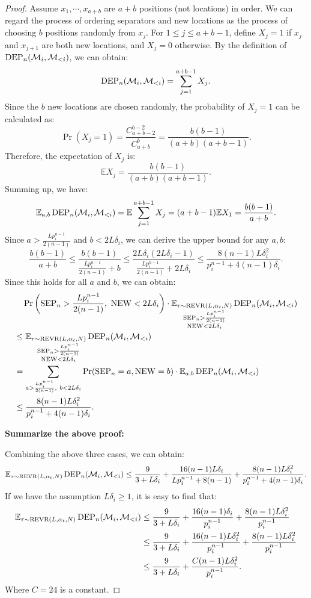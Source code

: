 \begin{proof}
Assume $x_1,\cdots,x_{a+b}$ are $a+b$ positions (not locations) in order. We can regard the process of ordering separators and new locations as the process of choosing $b$ positions randomly from $x_j$. For $1\leq j\leq a+b-1$, define $X_j=1$ if $x_j$ and $x_{j+1}$ are both new locations, and $X_j=0$ otherwise. By the definition of $\operatorname{DEP}_n({\mathcal{M}}_i, {\mathcal{M}}_{<i})$, we can obtain:
$$\operatorname{DEP}_n({\mathcal{M}}_i, {\mathcal{M}}_{<i})=\sum_{j=1}^{a+b-1}X_j.$$
Since the $b$ new locations are chosen randomly, the probability of $X_j=1$ can be calculated as:
$$\Pr(X_j=1)=\frac{C_{a+b-2}^{b-2}}{C_{a+b}^{b}}=\frac{b(b-1)}{(a+b)(a+b-1)}.$$
Therefore, the expectation of $X_j$ is:
$$\mathbb{E}X_j=\frac{b(b-1)}{(a+b)(a+b-1)}.$$
Summing up, we have:
$$\mathbb{E}_{a,b}\operatorname{DEP}_n({\mathcal{M}}_i, {\mathcal{M}}_{<i})=\mathbb{E}\sum_{j=1}^{a+b-1}X_j=(a+b-1)\mathbb{E}X_1=\frac{b(b-1)}{a+b}.$$
Since $a>\frac{Lp_i^{n-1}}{2(n-1)}$ and $b<2L\delta_i$, we can derive the upper bound for any $a,b$:
$$\frac{b(b-1)}{a+b}\leq \frac{b(b-1)}{\frac{Lp_i^{n-1}}{2(n-1)}+b} \leq\frac{2L\delta_i(2L\delta_i-1)}{\frac{Lp_i^{n-1}}{2(n-1)}+2L\delta_i}\leq \frac{8(n-1)L\delta_i^2}{p_i^{n-1}+4(n-1)\delta_i}.$$
Since this holds for all $a$ and $b$, we can obtain:
\begin{align*}
    &\quad\Pr\left(\SEP_n>\frac{Lp_i^{n-1}}{2(n-1)},\ \NEW< 2L\delta_i\right)\cdot\mathbb{E}_{\substack{\tau \sim \PROC(L, \alpha_t, N)\\ \SEP_n>\frac{Lp_i^{n-1}}{2(n-1)}\\ \NEW<2L\delta_i}} \DEP_n(\gM_i, \gM_{<i})\\
    &\leq \mathbb{E}_{\substack{\tau \sim \PROC(L, \alpha_t, N)\\ \SEP_n>\frac{Lp_i^{n-1}}{2(n-1)}\\ \NEW<2L\delta_i}} \DEP_n(\gM_i, \gM_{<i})\\
    &=\sum_{a>\frac{Lp_i^{n-1}}{2(n-1)},\ b<2L\delta_i}\Pr(\SEP_n=a, \NEW=b)\cdot\mathbb{E}_{a,b}\DEP_n(\gM_i, \gM_{<i})\\
    &\leq \frac{8(n-1)L\delta_i^2}{p_i^{n-1}+4(n-1)\delta_i}.
\end{align*}

\textbf{Summarize the above proof:}

Combining the above three cases, we can obtain:
$$\mathbb{E}_{\tau \sim \operatorname{REVR}(L, \alpha_t, N)} \operatorname{DEP}_n({\mathcal{M}}_i, {\mathcal{M}}_{<i}) \leq \frac{9}{3+L\delta_i}+\frac{16(n-1)L\delta_i}{Lp_i^{n-1}+8(n-1)}+\frac{8(n-1)L\delta_i^2}{p_i^{n-1}+4(n-1)\delta_i}.$$
If we have the assumption $L\delta_i\geq 1$, it is easy to find that:
\begin{align*}
    \mathbb{E}_{\tau \sim \operatorname{REVR}(L, \alpha_t, N)} \operatorname{DEP}_n({\mathcal{M}}_i, {\mathcal{M}}_{<i}) &\leq \frac{9}{3+L\delta_i}+\frac{16(n-1)\delta_i}{p_i^{n-1}}+\frac{8(n-1)L\delta_i^2}{p_i^{n-1}}\\
    &\leq \frac{9}{3+L\delta_i}+\frac{16(n-1)L\delta_i^2}{p_i^{n-1}}+\frac{8(n-1)L\delta_i^2}{p_i^{n-1}}\\
    &\leq \frac{9}{3+L\delta_i}+\frac{C(n-1)L\delta_i^2}{p_i^{n-1}}.
\end{align*}
Where $C=24$ is a constant.

\end{proof}

